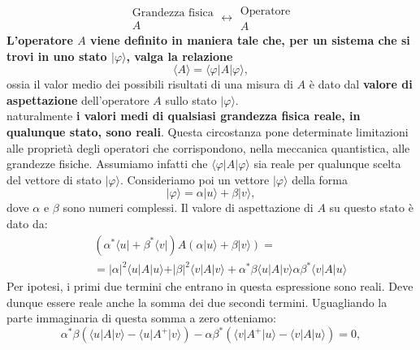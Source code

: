 \begin{equation}
\begin{array}{c}
\textrm{Grandezza fisica}\\
A
\end{array}
\longleftrightarrow
\begin{array}{c}
\textrm{Operatore}\\
A
\end{array}
\end{equation}
\textbf{L'operatore $A$ viene definito in maniera tale che, per un sistema che si trovi in uno stato $\vert \varphi \rangle $, valga la relazione}
\begin{equation}
\langle A \rangle = \langle \varphi \vert A \vert \varphi \rangle,
\end{equation}
ossia il valor medio dei possibili risultati di una misura di $A$ è dato dal \textbf{valore di aspettazione} dell'operatore $A$ sullo stato $\vert \varphi \rangle$.\\
naturalmente \textbf{i valori medi di qualsiasi grandezza fisica reale, in qualunque stato, sono reali}. Questa circostanza pone determinate limitazioni alle proprietà degli operatori che corrispondono, nella meccanica quantistica, alle grandezze fisiche. Assumiamo infatti che $\langle \varphi \vert A \vert \varphi \rangle$ sia reale per qualunque scelta del vettore di stato $\vert \varphi \rangle$. Consideriamo poi un vettore $\vert \varphi \rangle$ della forma
\begin{equation}
\vert \varphi \rangle = \alpha \vert u \rangle + \beta \vert v \rangle,
\end{equation}
dove $\alpha$ e $\beta$ sono numeri complessi. Il valore di aspettazione di $A$ su questo stato è dato da:
\begin{eqnarray}
& &\left( \alpha ^* \langle u \vert + \beta ^* \langle v \vert \right) A \left(\alpha \vert u \rangle + \beta \vert v \rangle \right) = \nonumber \\
& &=\vert \alpha \vert ^2 \langle u \vert A \vert u \rangle + \vert \beta \vert ^2 \langle v \vert A \vert v \rangle + \alpha ^* \beta \langle u \vert A \vert v \rangle \alpha  \beta ^* \langle v \vert A \vert u \rangle
\end{eqnarray}
Per ipotesi, i primi due termini che entrano in questa espressione sono reali. Deve dunque essere reale anche la somma dei due secondi termini. Uguagliando la parte immaginaria di questa somma a zero otteniamo:
\begin{equation}
\label{eq:cap4_1}
\alpha ^* \beta \left(\langle u \vert A \vert v \rangle -\langle u \vert A^{+} \vert v \rangle \right)-  \alpha  \beta ^* \left( \langle v \vert A^{+} \vert u \rangle -\langle v \vert A \vert u \rangle \right) =0, 
\end{equation}
